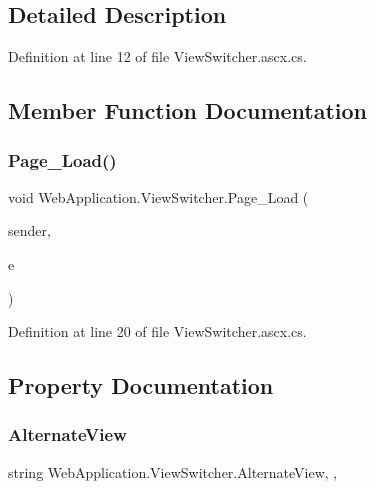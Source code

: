\subsection{Detailed Description}


Definition at line 12 of file View\+Switcher.\+ascx.\+cs.



\subsection{Member Function Documentation}
\mbox{\label{classWebApplication_1_1ViewSwitcher_a9bb1df92a074f9fd0b98960aa849e389}} 
\subsubsection{\texorpdfstring{Page\_Load()}{Page\_Load()}}
{\footnotesize\ttfamily void Web\+Application.\+View\+Switcher.\+Page\+\_\+\+Load (\begin{DoxyParamCaption}\item[{object}]{sender,  }\item[{Event\+Args}]{e }\end{DoxyParamCaption})\hspace{0.3cm}{\ttfamily [protected]}}



Definition at line 20 of file View\+Switcher.\+ascx.\+cs.



\subsection{Property Documentation}
\mbox{\label{classWebApplication_1_1ViewSwitcher_a5d5a902ce48161faaae1f4d7f087fc41}} 
\subsubsection{\texorpdfstring{AlternateView}{AlternateView}}
{\footnotesize\ttfamily string Web\+Application.\+View\+Switcher.\+Alternate\+View\hspace{0.3cm}{\ttfamily [get]}, {}, {\ttfamily [protected]}}



